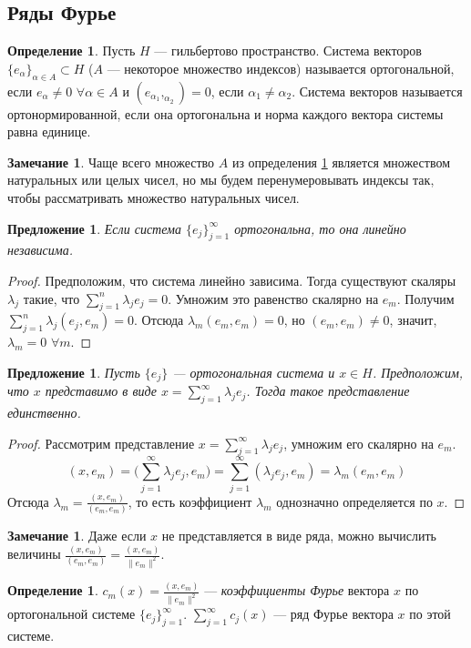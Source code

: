 \documentclass[11pt,openany,a4paper]{scrartcl}
\theoremstyle{plain}
\newtheorem{proposition}[theorem]{Предложение}
\theoremstyle{definition}
\newtheorem{definition}[theorem]{Определение}
\newtheorem{remark}[theorem]{Замечание}
\begin{document}
\subsection{Ряды Фурье}

\begin{definition}\label{orthogonal_system}
    Пусть $H$ — гильбертово пространство. Система векторов
    $\{e_\alpha\}_{\alpha \in A} \subset H$ ($A$ — некоторое множество индексов)
    называется ортогональной, если $e_\alpha \neq 0$ $\forall \alpha \in A$ и
    $(e_{\alpha_1}, _{\alpha_2}) = 0$, если $\alpha_1 \neq \alpha_2$. Система
    векторов называется ортонормированной, если она ортогональна и норма каждого
    вектора системы равна единице.
\end{definition}

\begin{remark}
    Чаще всего множество $A$ из определения \ref{orthogonal_system} является
    множеством натуральных или целых чисел, но мы будем перенумеровывать индексы 
    так, чтобы рассматривать множество натуральных чисел.
\end{remark}

\begin{proposition}
    Если система $\{e_j\}_{j=1}^\infty$ ортогональна, то она линейно независима.
\end{proposition}
\begin{proof}
    Предположим, что система линейно зависима. Тогда существуют скаляры
    $\lambda_j$ такие, что $\sum\limits_{j=1}^n \lambda_je_j = 0$. Умножим
    это равенство скалярно на $e_m$. Получим
    $\sum\limits_{j=1}^n \lambda_j(e_j, e_m) = 0$. Отсюда
    $\lambda_m(e_m, e_m) = 0$, но $(e_m, e_m) \neq 0$, значит,
    $\lambda_m = 0$ $\forall m$.
\end{proof}

\begin{proposition}
    Пусть $\{e_j\}$ — ортогональная система и $x\in H$. Предположим, что $x$ 
    представимо в виде $x = \sum\limits_{j=1}^\infty \lambda_je_j$. Тогда такое
    представление единственно.
\end{proposition}
\begin{proof}
    Рассмотрим представление $x = \sum\limits_{j=1}^\infty \lambda_je_j$, умножим 
    его скалярно на $e_m$.
    $$
    (x, e_m) = \bigg(\sum\limits_{j=1}^\infty \lambda_je_j, e_m\bigg) =
    \sum\limits_{j=1}^\infty(\lambda_je_j, e_m) = \lambda_m(e_m, e_m)
    $$
    Отсюда $\lambda_m = \frac{(x, e_m)}{(e_m, e_m)}$, то есть коэффициент
    $\lambda_m$ однозначно определяется по $x$.
\end{proof}
\begin{remark}
    Даже если $x$ не представляется в виде ряда, можно вычислить величины
    $\frac{(x, e_m)}{(e_m, e_m)} = \frac{(x, e_m)}{\|e_m\|^2}$.
\end{remark}
\begin{definition}
    $c_m(x) = \frac{(x, e_m)}{\|e_m\|^2}$ — \emph{коэффициенты Фурье} вектора
    $x$ по ортогональной системе $\{e_j\}_{j=1}^\infty$.
    $\sum\limits_{j=1}^\infty c_j(x)$ — ряд Фурье вектора $x$ по этой системе.
\end{definition}
\end{document}
